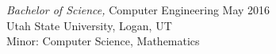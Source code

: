 \documentclass[line,margin]{res}
\begin{document}
\begin{resume}
   {\sl Bachelor of Science,} Computer Engineering \hfill May 2016\\
   Utah State University, Logan, UT\\
   Minor: Computer Science, Mathematics







\end{resume}
\end{document}
